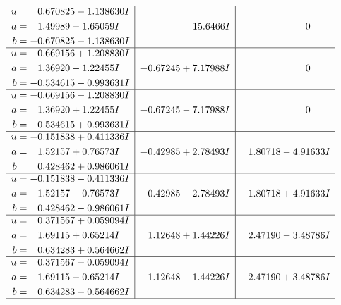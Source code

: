 \documentclass[1p]{elsarticle_modified}
\theoremstyle{definition}
\begin{document}
$$\begin{array}{c|c|c}
\begin{aligned}
u &= \phantom{-}0.670825 - 1.138630 I \\
a &= \phantom{-}1.49989 - 1.65059 I \\
b &= -0.670825 - 1.138630 I\end{aligned}
 & \phantom{-0.000000 -}15.6466 I & \phantom{-0.000000 } 0 \\ \hline\begin{aligned}
u &= -0.669156 + 1.208830 I \\
a &= \phantom{-}1.36920 - 1.22455 I \\
b &= -0.534615 - 0.993631 I\end{aligned}
 & -0.67245 + 7.17988 I & \phantom{-0.000000 } 0 \\ \hline\begin{aligned}
u &= -0.669156 - 1.208830 I \\
a &= \phantom{-}1.36920 + 1.22455 I \\
b &= -0.534615 + 0.993631 I\end{aligned}
 & -0.67245 - 7.17988 I & \phantom{-0.000000 } 0 \\ \hline\begin{aligned}
u &= -0.151838 + 0.411336 I \\
a &= \phantom{-}1.52157 + 0.76573 I \\
b &= \phantom{-}0.428462 + 0.986061 I\end{aligned}
 & -0.42985 + 2.78493 I & \phantom{-}1.80718 - 4.91633 I \\ \hline\begin{aligned}
u &= -0.151838 - 0.411336 I \\
a &= \phantom{-}1.52157 - 0.76573 I \\
b &= \phantom{-}0.428462 - 0.986061 I\end{aligned}
 & -0.42985 - 2.78493 I & \phantom{-}1.80718 + 4.91633 I \\ \hline\begin{aligned}
u &= \phantom{-}0.371567 + 0.059094 I \\
a &= \phantom{-}1.69115 + 0.65214 I \\
b &= \phantom{-}0.634283 + 0.564662 I\end{aligned}
 & \phantom{-}1.12648 + 1.44226 I & \phantom{-}2.47190 - 3.48786 I \\ \hline\begin{aligned}
u &= \phantom{-}0.371567 - 0.059094 I \\
a &= \phantom{-}1.69115 - 0.65214 I \\
b &= \phantom{-}0.634283 - 0.564662 I\end{aligned}
 & \phantom{-}1.12648 - 1.44226 I & \phantom{-}2.47190 + 3.48786 I\\
 \hline 
 \end{array}$$\newpage
\end{document}
